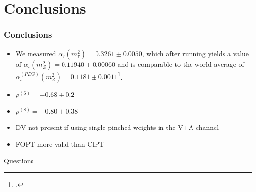\documentclass{beamer}
\begin{document}
\section{Conclusions}
\begin{frame}
  \frametitle{Conclusions}
  \begin{itemize}
  \item We measured \(\alpha_s(m_\tau^2) = 0.3261 \pm 0.0050\), which after
    running yields a value of \(\alpha_s(m_Z^2) = 0.11940 \pm 0.00060 \) and is
    comparable to the world average of \(\alpha_s^{(PDG)}(m_Z^2) = 0.1181 \pm
    0.0011\)\footcite{PDG2018}.
  \item \(\rho^{(6)} = -0.68 \pm 0.2\)
  \item \(\rho^{(8)} = -0.80 \pm 0.38\)
  \item DV not present if using single pinched weights in the V+A channel
  \item FOPT more valid than CIPT
  \end{itemize}
\end{frame}


\begin{frame}
  \centering

  \vspace{0.5cm}

  \LARGE Questions
\end{frame}
\end{document}
